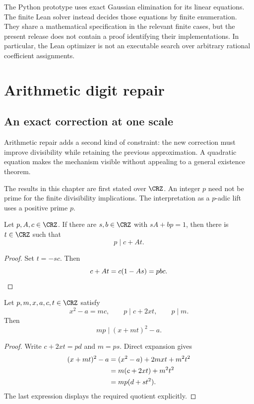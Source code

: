 The Python prototype uses exact Gaussian elimination for its linear equations. The finite Lean solver instead decides those equations by finite enumeration. They share a mathematical specification in the relevant finite cases, but the present release does not contain a proof identifying their implementations. In particular, the Lean optimizer is not an executable search over arbitrary rational coefficient assignments.

\section{Arithmetic digit repair}\label{CR:cr-source-section-6}\label{CR:ch:arithmetic}
\subsection{An exact correction at one scale}
Arithmetic repair adds a second kind of constraint: the new correction must improve divisibility while retaining the previous approximation. A quadratic equation makes the mechanism visible without appealing to a general existence theorem.

The results in this chapter are first stated over $\CRZ$. An integer $p$ need not be prime for the finite divisibility implications. The interpretation as a $p$-adic lift uses a positive prime $p$.

\begin{CRlemma}\label{CR:lem:digit}
Let $p,A,c\in\CRZ$. If there are $s,b\in\CRZ$ with $sA+bp=1$, then there is $t\in\CRZ$ such that
\[
p\mid c+At.
\]
\end{CRlemma}
\begin{proof}
Set $t=-sc$. Then
\[
c+At=c(1-As)=pbc.\qedhere
\]
\end{proof}

\begin{CRlemma}\label{CR:lem:quad}
Let $p,m,x,a,c,t\in\CRZ$ satisfy
\[
x^2-a=mc,\qquad p\mid c+2xt,\qquad p\mid m.
\]
Then
\[
mp\mid (x+mt)^2-a.
\]
\end{CRlemma}
\begin{proof}
Write $c+2xt=pd$ and $m=ps$. Direct expansion gives
\begin{align*}
(x+mt)^2-a
&=(x^2-a)+2mxt+m^2t^2\\
&=m(c+2xt)+m^2t^2\\
&=mp(d+st^2).\qedhere
\end{align*}
The last expression displays the required quotient explicitly.
\end{proof}

